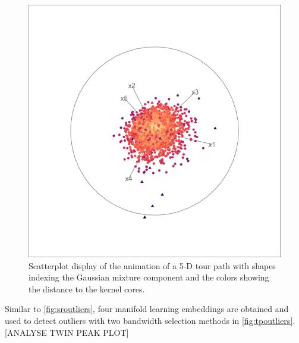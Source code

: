 \documentclass[11pt,a4paper,]{article}
\begin{document}
\begin{figure}

{\centering \includegraphics[width=0.7\linewidth]{figures/tourr_5d_semisphere} 

}

\caption{Scatterplot display of the animation of a 5-D tour path with shapes indexing the Gaussian mixture component and the colors showing the distance to the kernel cores.}\label{fig:fivedmeta}
\end{figure}

Similar to \autoref{fig:sroutliers}, four manifold learning embeddings are obtained and used to detect outliers with two bandwidth selection methods in \autoref{fig:tpoutliers}.
{[}ANALYSE TWIN PEAK PLOT{]}
\end{document}
